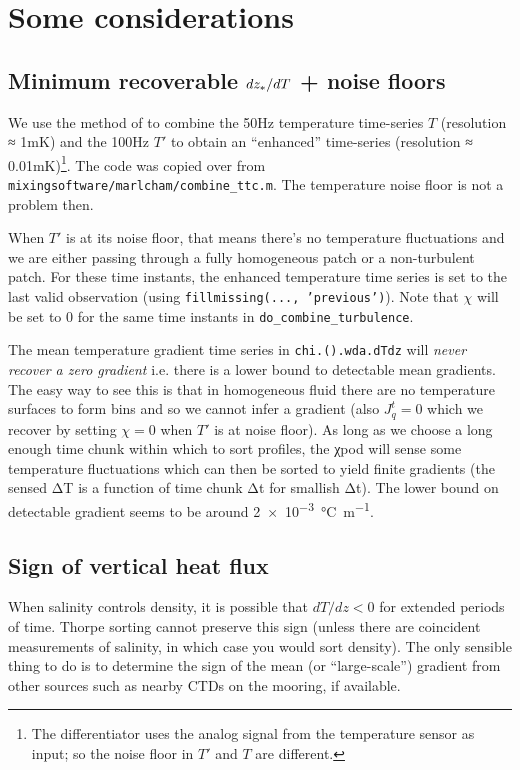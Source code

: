 \section{Some considerations}

\subsection{Minimum recoverable $dz_{*}/dT$ + noise floors}

We use the method of \cite{Mudge1994} to combine the 50Hz temperature time-series $T$ (resolution ≈ 1mK) and the 100Hz $T'$ to obtain an ``enhanced'' time-series (resolution ≈ 0.01mK)\footnote{The differentiator uses the analog signal from the temperature sensor as input; so the noise floor in $T'$ and $T$ are different.}.
The code was copied over from \texttt{mixingsoftware/marlcham/combine\_ttc.m}.
The temperature noise floor is not a problem then.

When $T'$ is at its noise floor, that means there's no temperature fluctuations and we are either passing through a fully homogeneous patch or a non-turbulent patch.
For these time instants, the enhanced temperature time series is set to the last valid observation (using \texttt{fillmissing(..., 'previous')}).
Note that $χ$ will be set to 0 for the same time instants in \texttt{do\_combine\_turbulence}.

The mean temperature gradient time series in \texttt{chi.().wda.dTdz} will \emph{never recover a zero gradient} i.e. there is a lower bound to detectable mean gradients.
The easy way to see this is that in homogeneous fluid there are no temperature surfaces to form bins and so we cannot infer a gradient (also $J_q^t = 0$ which we recover by setting $χ=0$ when $T'$ is at noise floor).
As long as we choose a long enough time chunk within which to sort profiles, the χpod will sense some temperature fluctuations which can then be sorted to yield finite gradients (the sensed ΔT is a function of time chunk Δt for smallish Δt).
The lower bound on detectable gradient seems to be around \SI{2e-3}{\celsius\per\metre}.

\subsection{Sign of vertical heat flux}
When salinity controls density, it is possible that $dT/dz < 0$ for extended periods of time.
Thorpe sorting cannot preserve this sign (unless there are coincident measurements of salinity, in which case you would sort density).
The only sensible thing to do is to determine the sign of the mean (or ``large-scale'') gradient from other sources such as nearby CTDs on the mooring, if available.

